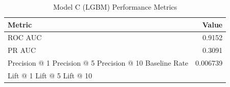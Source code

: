 \begin{table}[h]
\centering
\begin{tabular}{lr}
\toprule
Metric & Value \\
\midrule
ROC AUC & 0.9152 \\
PR AUC & 0.3091 \\
Precision @ 1%
Precision @ 5%
Precision @ 10%
Baseline Rate & 0.006739 \\
Lift @ 1%
Lift @ 5%
Lift @ 10%
\bottomrule
\end{tabular}
\caption{Model C (LGBM) Performance Metrics}
\label{tab:modelc_lgbm_metrics}
\end{table}

